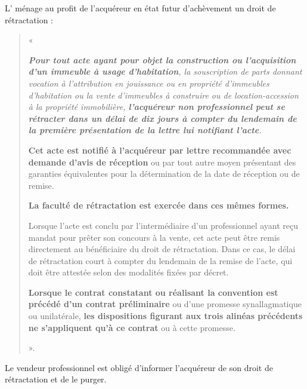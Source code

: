 				L’\cch{} ménage au profit de l’acquéreur en état futur d’achèvement un droit de rétractation :
				\begin{quote}
					« {\itshape \textbf{Pour tout acte ayant pour objet la construction ou l'acquisition d'un immeuble à usage d'habitation}, la souscription de parts donnant vocation à l'attribution en jouissance ou en propriété d'immeubles d'habitation ou la vente d'immeubles à construire ou de location-accession à la propriété immobilière, \textbf{l'acquéreur non professionnel peut se rétracter dans un délai de dix jours à compter du lendemain de la première présentation de la lettre lui notifiant l'acte}.

					\medskip\textbf{Cet acte est notifié à l'acquéreur par lettre recommandée avec demande d'avis de réception} ou par tout autre moyen présentant des garanties équivalentes pour la détermination de la date de réception ou de remise.

					\medskip\textbf{La faculté de rétractation est exercée dans ces mêmes formes. }

					\medskip Lorsque l'acte est conclu par l'intermédiaire d'un professionnel ayant reçu mandat pour prêter son concours à la vente, cet acte peut être remis directement au bénéficiaire du droit de rétractation. Dans ce cas, le délai de rétractation court à compter du lendemain de la remise de l'acte, qui doit être attestée selon des modalités fixées par décret.

					\medskip \textbf{Lorsque le contrat constatant ou réalisant la convention est précédé d'un contrat préliminaire} ou d'une promesse synallagmatique ou unilatérale, \textbf{les dispositions figurant aux trois alinéas précédents ne s'appliquent qu'à ce contrat} ou à cette promesse.
}

					\lips ».
				\end{quote}

				Le vendeur professionnel est obligé d’informer l’acquéreur de son droit de rétractation et de le purger.

